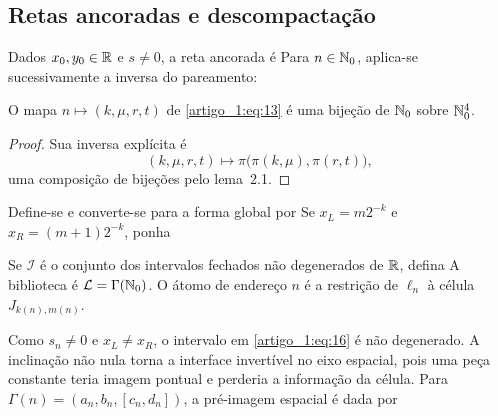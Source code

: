 \subsection{Retas ancoradas e descompactação}
Dados $x_0,y_0\in\mathbb R$ e $s\ne0$, a reta ancorada é
Para $n\in\mathbb N_0$, aplica-se sucessivamente a inversa do pareamento:
\begin{lema}\label{map:artigo_1:3.2}
O mapa $n\mapsto(k,\mu,r,t)$ de \eqref{artigo_1:eq:13} é uma bijeção de $\mathbb N_0$ sobre $\mathbb N_0^4$.
\end{lema}
\begin{proof}
Sua inversa explícita é
\[
(k,\mu,r,t)\longmapsto\pi\bigl(\pi(k,\mu),\pi(r,t)\bigr),
\]
uma composição de bijeções pelo lema~2.1.
\end{proof}
Define-se
e converte-se para a forma global por
Se $x_L=m2^{-k}$ e $x_R=(m+1)2^{-k}$, ponha
\begin{definicao}\label{map:artigo_1:3.3}
Se $\mathcal I$ é o conjunto dos intervalos fechados não degenerados de $\mathbb R$, defina
A biblioteca é $\mathcal L=\Gamma(\mathbb N_0)$. O átomo de endereço $n$ é a restrição de $\ell_n$ à célula $J_{k(n),m(n)}$.
\end{definicao}
Como $s_n\ne0$ e $x_L\ne x_R$, o intervalo em \eqref{artigo_1:eq:16} é não degenerado. A inclinação não nula torna a interface invertível no eixo espacial, pois uma peça constante teria imagem pontual e perderia a informação da célula. Para $\Gamma(n)=(a_n,b_n,[c_n,d_n])$, a pré-imagem espacial é dada por

